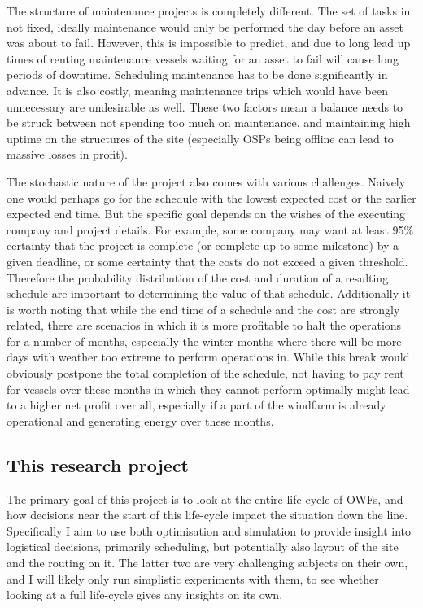 \documentclass[a4paper,12pt]{article}
\begin{document}
The structure of maintenance projects is completely different. The set of tasks in not fixed, ideally maintenance would only be performed the day before an asset was about to fail. However, this is impossible to predict, and due to long lead up times of renting maintenance vessels waiting for an asset to fail will cause long periods of downtime. Scheduling maintenance has to be done significantly in advance. It is also costly, meaning maintenance trips which would have been unnecessary are undesirable as well. These two factors mean a balance needs to be struck between not spending too much on maintenance, and maintaining high uptime on the structures of the site (especially OSPs being offline can lead to massive losses in profit). 

The stochastic nature of the project also comes with various challenges. Naively one would perhaps go for the schedule with the lowest expected cost or the earlier expected end time. But the specific goal depends on the wishes of the executing company and project details. For example, some company may want at least 95\% certainty that the project is complete (or complete up to some milestone) by a given deadline, or some certainty that the costs do not exceed a given threshold. Therefore the probability distribution of the cost and duration of a resulting schedule are important to determining the value of that schedule. Additionally it is worth noting that while the end time of a schedule and the cost are strongly related, there are scenarios in which it is more profitable to halt the operations for a number of months, especially the winter months where there will be more days with weather too extreme to perform operations in. While this break would obviously postpone the total completion of the schedule, not having to pay rent for vessels over these months in which they cannot perform optimally might lead to a higher net profit over all, especially if a part of the windfarm is already operational and generating energy over these months. 


\subsection{This research project} \label{ss:objs}
The primary goal of this project is to look at the entire life-cycle of OWFs, and how decisions near the start of this life-cycle impact the situation down the line. Specifically I aim to use both optimisation and simulation to provide insight into logistical decisions, primarily scheduling, but potentially also layout of the site and the routing on it. The latter two are very challenging subjects on their own, and I will likely only run simplistic experiments with them, to see whether looking at a full life-cycle gives any insights on its own.
\end{document}

